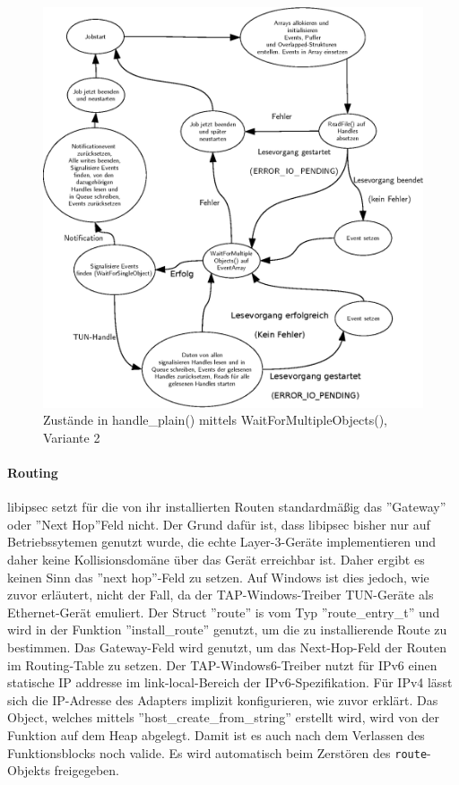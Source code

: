 {\begin{figure}
\centering
\def\svgwidth{\columnwidth}
\includegraphics[width=\textwidth]{WaitForMultipleObjects2.eps}
\caption{Zustände in handle\_plain() mittels WaitForMultipleObjects(), Variante 2}
\label{fig:WaitForMultipleObjects2}
\end{figure}

\paragraph{Routing}
libipsec setzt für die von ihr installierten Routen standardmäßig das ''Gateway''
oder ''Next Hop''Feld nicht. Der Grund dafür ist, dass libipsec bisher nur auf
Betriebssytemen genutzt wurde, die echte Layer-3-Geräte implementieren und
daher keine Kollisionsdomäne über das Gerät erreichbar ist. Daher ergibt es keinen
Sinn das ''next hop''-Feld zu setzen.
Auf Windows ist dies jedoch, wie zuvor erläutert, nicht der Fall, da der TAP-Windows-Treiber
TUN-Geräte als Ethernet-Gerät emuliert.
Der Struct ''route'' is vom Typ ''route\_entry\_t'' und wird in der Funktion
''install\_route'' genutzt, um die zu installierende Route zu bestimmen.
Das Gateway-Feld wird genutzt, um das Next-Hop-Feld der Routen im Routing-Table
zu setzen. 
Der TAP-Windows6-Treiber nutzt für IPv6 einen statische IP addresse im link-local-Bereich
der IPv6-Spezifikation.
Für IPv4 lässt sich die IP-Adresse des Adapters implizit konfigurieren, wie zuvor erklärt.
Das Object, welches mittels ''host\_create\_from\_string'' erstellt wird,
wird von der Funktion auf dem Heap abgelegt. Damit ist es auch nach dem Verlassen
des Funktionsblocks noch valide. Es wird automatisch beim Zerstören des
\texttt{route}-Objekts freigegeben.

}

